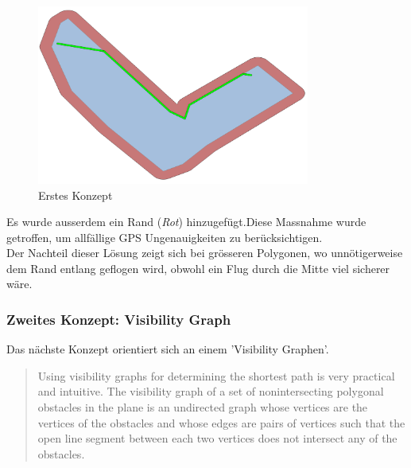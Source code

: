 \begin{figure}[H]
	\centering
	\includegraphics[width=0.8\textwidth]{images/routing/firstSolution.png}
	\caption{Erstes Konzept}
	\label{fig:first-concet-routing}
\end{figure}
Es wurde ausserdem ein Rand (\textit{Rot}) hinzugefügt.Diese Massnahme wurde getroffen, um allfällige GPS Ungenauigkeiten zu berücksichtigen.\\

Der Nachteil dieser Lösung zeigt sich bei grösseren Polygonen, wo unnötigerweise dem Rand entlang geflogen wird, obwohl ein Flug durch die Mitte viel sicherer wäre.
\newpage
\subsubsection{Zweites Konzept: Visibility Graph}
Das nächste Konzept orientiert sich an einem 'Visibility Graphen'. 
\cite[]{IEEEPaper} 

\blockquote{Using visibility graphs for determining the shortest path is very practical and intuitive. The visibility graph of a set of nonintersecting polygonal obstacles in the plane is an undirected graph whose vertices are the vertices of the obstacles and whose edges are pairs of vertices such that the open line segment between each two vertices does not intersect any of the obstacles.}

